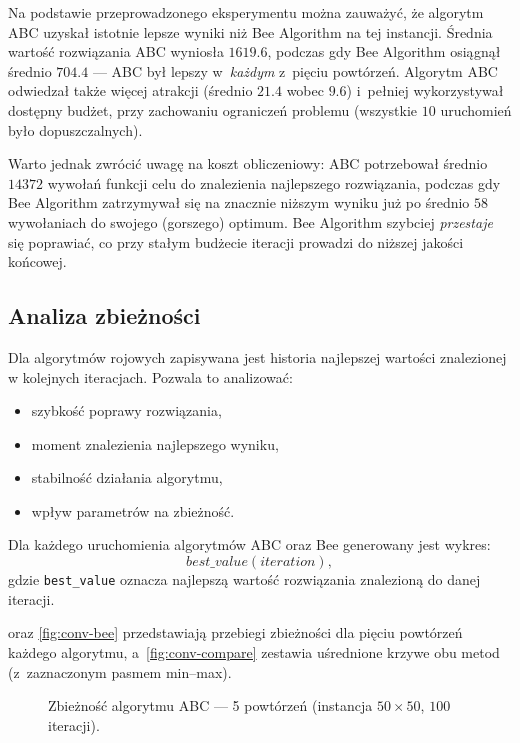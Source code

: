 Na podstawie przeprowadzonego eksperymentu można zauważyć, że algorytm ABC
uzyskał istotnie lepsze wyniki niż Bee Algorithm na tej instancji. Średnia
wartość rozwiązania ABC wyniosła $1619.6$, podczas gdy Bee Algorithm osiągnął
średnio $704.4$ --- ABC był lepszy w~\emph{każdym} z~pięciu powtórzeń. Algorytm
ABC odwiedzał także więcej atrakcji (średnio $21.4$ wobec $9.6$) i~pełniej
wykorzystywał dostępny budżet, przy zachowaniu ograniczeń problemu (wszystkie
$10$ uruchomień było dopuszczalnych).

Warto jednak zwrócić uwagę na koszt obliczeniowy: ABC potrzebował średnio
$14372$ wywołań funkcji celu do znalezienia najlepszego rozwiązania, podczas
gdy Bee Algorithm zatrzymywał się na znacznie niższym wyniku już po średnio
$58$ wywołaniach do swojego (gorszego) optimum. Bee Algorithm szybciej
\emph{przestaje} się poprawiać, co przy stałym budżecie iteracji prowadzi do
niższej jakości końcowej.

\subsection{Analiza zbieżności}

Dla algorytmów rojowych zapisywana jest historia najlepszej wartości znalezionej
w kolejnych iteracjach. Pozwala to analizować:
\begin{itemize}
    \item szybkość poprawy rozwiązania,
    \item moment znalezienia najlepszego wyniku,
    \item stabilność działania algorytmu,
    \item wpływ parametrów na zbieżność.
\end{itemize}

Dla każdego uruchomienia algorytmów ABC oraz Bee generowany jest wykres:
\[
    best\_value(iteration),
\]
gdzie \texttt{best\_value} oznacza najlepszą wartość rozwiązania znalezioną
do danej iteracji.

 oraz \cref{fig:conv-bee} przedstawiają przebiegi zbieżności
dla pięciu powtórzeń każdego algorytmu, a~\cref{fig:conv-compare} zestawia
uśrednione krzywe obu metod (z~zaznaczonym pasmem min--max).

\begin{figure}[H]
\centering

\caption{Zbieżność algorytmu ABC --- 5 powtórzeń (instancja $50\times50$, $100$ iteracji).}
\label{fig:conv-abc}
\end{figure}

